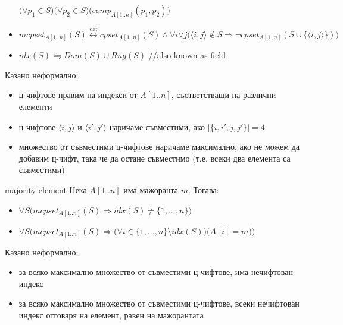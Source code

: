 \begin{solution}
\begin{boxlocaldefinition*}{}{}
\begin{itemize}
			\hspace{3.2cm}$\big(\forall p_1\in S\big)\big(\forall p_2\in S\big)\big(comp_{A[1..n]}(p_1,p_2)\big)$
			\item $mcpset_{A[1..n]}(S)\overset{\text{def}}\leftrightarrow cpset_{A[1..n]}(S)\land\forall i\forall j\big(\langle i,j\rangle\notin S\Rightarrow\lnot cpset_{A[1..n]}(S\cup\{\langle i,j\rangle\})\big)$
			\item $idx(S)\leftrightharpoons Dom(S)\cup Rng(S)$ //also known as field
		\end{itemize}
	\end{boxlocaldefinition*}
	\begin{remark*}
		Казано неформално:
		\begin{itemize}
			\item ц-чифтове правим на индекси от $A[1..n]$, съответстващи на различни елементи
			\item ц-чифтове $\langle i,j\rangle$ и $\langle i',j'\rangle$ наричаме съвместими, ако $|\{i,i',j,j'\}|=4$
			\item множество от съвместими ц-чифтове наричаме максимално, ако не можем да добавим ц-чифт, така че да остане съвместимо (т.е. всеки два елемента са съвместими)
		\end{itemize}
	\end{remark*}%
	\vspace{0.3cm}
	\begin{boxproposition}{}{majority-element}
		Нека $A[1..n]$ има мажоранта $m$. Тогава:
		\begin{itemize}
			\item $\forall S\big(mcpset_{A[1..n]}(S)\Rightarrow idx(S)\ne\{1,\dots,n\}\big)$
			\item $\forall S\Big(mcpset_{A[1..n]}(S)\Rightarrow\big(\forall i\!\in\!\{1,\dots,n\}\!\setminus\! idx(S)\big)\big(A[i]=m\big)\Big)$
		\end{itemize}
	\end{boxproposition}
	\begin{remark*}
		Казано неформално:
		\begin{itemize}
			\item за всяко максимално множество от съвместими ц-чифтове, има нечифтован индекс
			\item за всяко максимално множество от съвместими ц-чифтове, всеки нечифтован индекс отговаря на елемент, равен на мажорантата
		\end{itemize}
	\end{remark*}


\end{solution}
